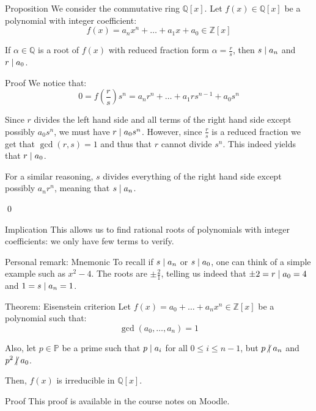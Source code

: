 \documentclass[a4paper]{article}
\begin{document}
\begin{parag}{Proposition}
    We consider the commutative ring $\mathbb{Q}\left[x\right]$. Let $f\left(x\right) \in \mathbb{Q}\left[x\right]$ be a polynomial with integer coefficient: 
    \[f\left(x\right) = a_n x^n + \ldots + a_1 x + a_0  \in \mathbb{Z}\left[x\right]\]
    
    If $\alpha\in \mathbb{Q}$ is a root of $f\left(x\right)$ with reduced fraction form $\alpha = \frac{r}{s}$, then $s \mid a_n$ and $r \mid a_0$.

    \begin{subparag}{Proof}
        We notice that: 
        \[0 = f\left(\frac{r}{s}\right)s^n = a_n r^n + \ldots + a_1 r s^{n-1} + a_0 s^n\]
        
        Since $r$ divides the left hand side and all terms of the right hand side except possibly $a_0 s^n$, we must have $r \mid a_0 s^n$. However, since $\frac{r}{s}$ is a reduced fraction we get that $\gcd\left(r, s\right) = 1$ and thus that $r$ cannot divide $s^n$. This indeed yields that $r \mid a_0$.

        For a similar reasoning, $s$ divides everything of the right hand side except possibly $a_n r^n$, meaning that $s \mid a_n$.

        \qed
    \end{subparag}

    \begin{subparag}{Implication}
        This allows us to find rational roots of polynomials with integer coefficients: we only have few terms to verify.
    \end{subparag}

    \begin{subparag}{Personal remark: Mnemonic}
        To recall if $s \mid a_n$ or $s \mid a_0$, one can think of a simple example such as $x^2 - 4$. The roots are $\pm\frac{2}{1}$, telling us indeed that $\pm 2 = r \mid a_0 = 4$ and $1 = s \mid a_n = 1$.
    \end{subparag}
\end{parag}

\begin{parag}{Theorem: Eisenstein criterion}
    Let $f\left(x\right) = a_0 + \ldots + a_n x^n \in \mathbb{Z}\left[x\right]$ be a polynomial such that: 
    \[\gcd\left(a_0, \ldots, a_n\right) = 1\]
    
    Also, let $p \in \mathbb{P}$ be a prime such that $p \mid a_i$ for all $0 \leq i \leq n-1$, but $p \ndivides a_n$ and $p^2 \ndivides a_0$.

    Then, $f\left(x\right)$ is irreducible in $\mathbb{Q}\left[x\right]$.

    \begin{subparag}{Proof}
        This proof is available in the course notes on Moodle.
    \end{subparag}
\end{parag}
\end{document}
